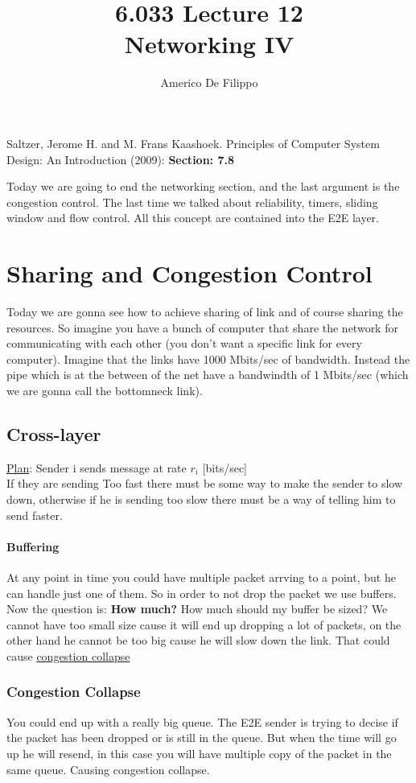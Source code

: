 \documentclass{article}
\title{6.033 Lecture 12 \\ Networking IV}
\author{Americo De Filippo}
\begin{document}
 
  \maketitle
  \begin{thebibliography}{9}
    Saltzer, Jerome H. and M. Frans Kaashoek. Principles of Computer System Design: An Introduction (2009): \textbf{Section: 7.8}
  \end{thebibliography}
  Today we are going to end the networking section, and the last argument is the 
  congestion control. The last time we talked about reliability, timers, sliding window and
  flow control. All this concept are contained into the E2E layer.
  \section{Sharing and Congestion Control}
    Today we are gonna see how to achieve sharing of link and of course sharing the resources. 
    So imagine you have a bunch of computer that share the network for communicating with
    each other (you don't want a specific link for every computer). Imagine that the links
    have 1000 Mbits/sec of bandwidth. Instead the pipe which is at the between of the net
    have a bandwindth of 1 Mbits/sec (which we are gonna call the bottomneck link).
    \subsection{Cross-layer}
      \underline{Plan}: Sender i sends message at rate $r_i$ [bits/sec] \\ If they are sending
      Too fast there must be some way to make the sender to slow down, otherwise if he is 
      sending too slow there must be a way of telling him to send faster.
      \paragraph{Buffering} At any point in time you could have multiple packet arrving to
        a point, but he can handle just one of them. So in order to not drop the packet we
        use buffers. Now the question is: \textbf{How much?} How much should my buffer be 
        sized? We cannot have too small size cause it will end up dropping a lot of packets, 
        on the other hand he cannot be too big cause he will slow down the link. That could 
        cause \underline{congestion collapse}
        \subsubsection{Congestion Collapse}
          You could end up with a really big queue. The E2E sender is trying to decise if the
          packet has been dropped or is still in the queue. But when the time will go up 
          he will resend, in this case you will have multiple copy of the packet in the same
          queue. Causing congestion collapse.
\end{document}
